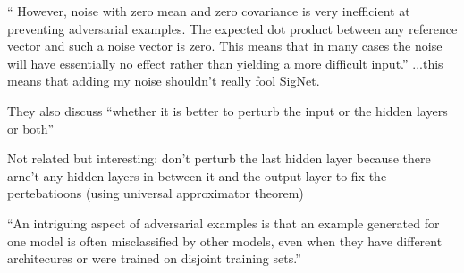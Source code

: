 `` However, noise
with zero mean and zero covariance is very inefficient at preventing adversarial examples. The
expected dot product between any reference vector and such a noise vector is zero. This means that
in many cases the noise will have essentially no effect rather than yielding a more difficult input.''
...this means that adding my noise shouldn't really fool SigNet.

They also discuss ``whether it is better to perturb the input or the hidden layers or both''

Not related but interesting: don't perturb the last hidden layer because there arne't any hidden layers in between it and the output layer to fix the pertebatioons (using  universal approximator theorem)

``An intriguing aspect of adversarial examples is that an example generated for one model is often
misclassified by other models, even when they have different architecures or were trained on disjoint training sets.''
